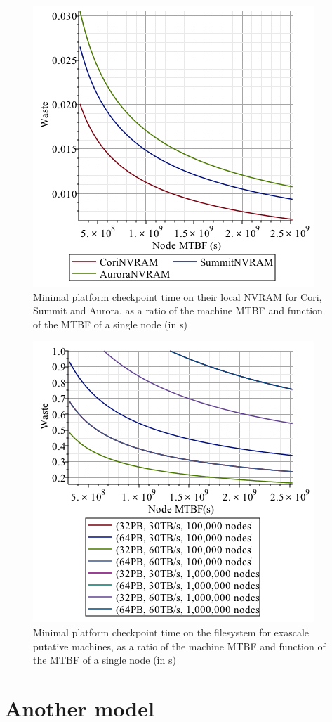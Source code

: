 \documentclass{article}
\begin{document}
\begin{figure}[h!]
\begin{center}
  \includegraphics[width=.6\linewidth]{csa-nvram.png}
\end{center}
\caption{Minimal platform checkpoint time on their local NVRAM for Cori, Summit and Aurora, as a ratio of the machine MTBF and function of the MTBF of a single node (in s)\label{fig:csa-nvram}}
\end{figure}

\begin{figure}[h!]
\begin{center}
  \includegraphics[width=.6\linewidth]{exa.png}
\end{center}
\caption{Minimal platform checkpoint time on the filesystem for exascale putative machines, as a ratio of the machine MTBF and function of the MTBF of a single node (in s)\label{fig:exa}}
\end{figure}

\clearpage
\section{Another model}
\end{document}
